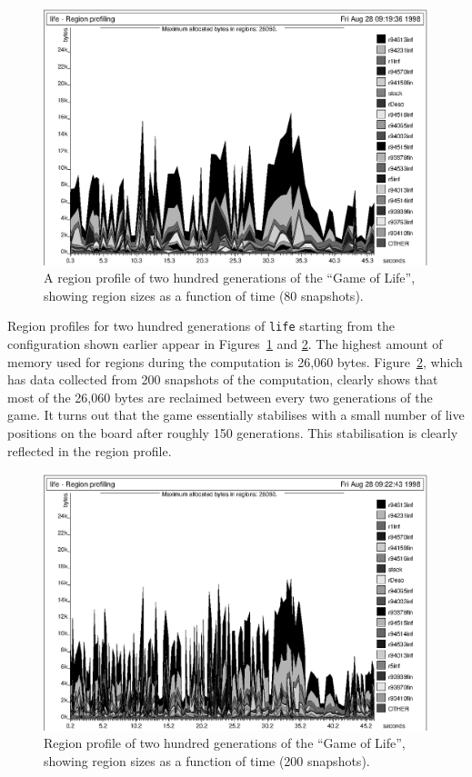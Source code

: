 \documentclass[12pt]{book}
\begin{document}
\begin{figure}
\begin{center}
\includegraphics{life80.ps}
\end{center}
\caption{A region profile of two hundred 
  generations of the ``Game of Life'', showing region sizes as a
  function of time (80 snapshots).}
\label{lifeprof80.fig}
\end{figure}

Region profiles for two hundred generations of {\tt life} starting
from the configuration shown earlier appear in
Figures~\ref{lifeprof80.fig} and \ref{lifeprof200.fig}.  The highest
amount of memory used for regions during the computation is 26,060
bytes. Figure~\ref{lifeprof200.fig}, which has data collected from 200
snapshots of the computation, clearly shows that most of the 26,060
bytes are reclaimed between every two generations of the game. It
turns out that the game essentially stabilises with a small number of
live positions on the board after roughly 150 generations.  This
stabilisation is clearly reflected in the region profile.

\begin{figure}
\begin{center}
\includegraphics{life200.ps}
\end{center}
\caption{Region profile of two hundred 
  generations of the ``Game of Life'', showing region sizes as a
  function of time (200 snapshots).}
\label{lifeprof200.fig}
\end{figure}
\end{document}
